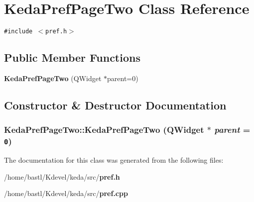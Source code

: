 \section{Keda\-Pref\-Page\-Two Class Reference}
\label{classKedaPrefPageTwo}
{\tt \#include $<$pref.h$>$}

\subsection*{Public Member Functions}
\begin{CompactItemize}
\item 
{\bf Keda\-Pref\-Page\-Two} (QWidget $\ast$parent=0)
\end{CompactItemize}


\subsection{Constructor \& Destructor Documentation}
\subsubsection{\setlength{\rightskip}{0pt plus 5cm}Keda\-Pref\-Page\-Two::Keda\-Pref\-Page\-Two (QWidget $\ast$ {\em parent} = {\tt 0})}\label{classKedaPrefPageTwo_87943ee311db95f5308e94bbfd7cd82b}




The documentation for this class was generated from the following files:\begin{CompactItemize}
\item 
/home/bastl/Kdevel/keda/src/{\bf pref.h}\item 
/home/bastl/Kdevel/keda/src/{\bf pref.cpp}\end{CompactItemize}

